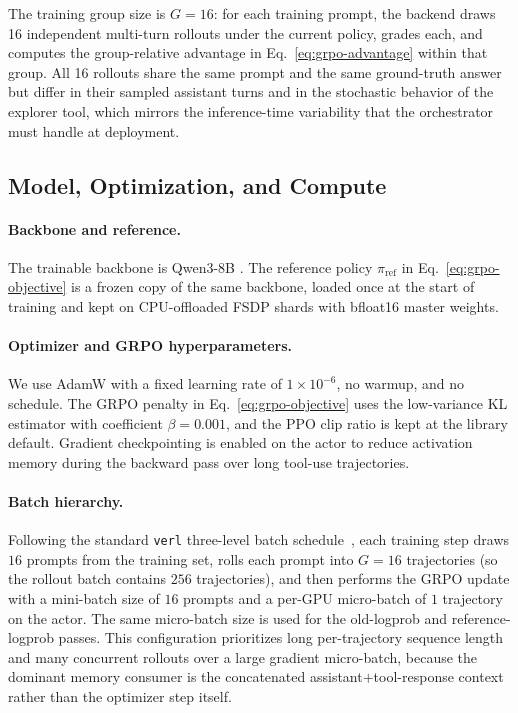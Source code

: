 The training group size is $G{=}16$: for each training prompt, the backend draws 16 independent multi-turn rollouts under the current policy, grades each, and computes the group-relative advantage in Eq.~\eqref{eq:grpo-advantage} within that group. All 16 rollouts share the same prompt and the same ground-truth answer but differ in their sampled assistant turns and in the stochastic behavior of the explorer tool, which mirrors the inference-time variability that the orchestrator must handle at deployment.

\subsection{Model, Optimization, and Compute}
\label{app:training-optim}

\paragraph{Backbone and reference.}
The trainable backbone is Qwen3-8B \citep{qwen3_paper}. The reference policy $\pi_{\mathrm{ref}}$ in Eq.~\eqref{eq:grpo-objective} is a frozen copy of the same backbone, loaded once at the start of training and kept on CPU-offloaded FSDP shards with bfloat16 master weights.

\paragraph{Optimizer and GRPO hyperparameters.}
We use AdamW with a fixed learning rate of $1{\times}10^{-6}$, no warmup, and no schedule. The GRPO penalty in Eq.~\eqref{eq:grpo-objective} uses the low-variance KL estimator with coefficient $\beta = 0.001$, and the PPO clip ratio is kept at the library default. Gradient checkpointing is enabled on the actor to reduce activation memory during the backward pass over long tool-use trajectories.

\paragraph{Batch hierarchy.}
Following the standard \texttt{verl} three-level batch schedule~\citep{verl_sheng2024hybridflow}, each training step draws $16$ prompts from the training set, rolls each prompt into $G{=}16$ trajectories (so the rollout batch contains $256$ trajectories), and then performs the GRPO update with a mini-batch size of $16$ prompts and a per-GPU micro-batch of $1$ trajectory on the actor. The same micro-batch size is used for the old-logprob and reference-logprob passes. This configuration prioritizes long per-trajectory sequence length and many concurrent rollouts over a large gradient micro-batch, because the dominant memory consumer is the concatenated assistant$+$tool-response context rather than the optimizer step itself.

